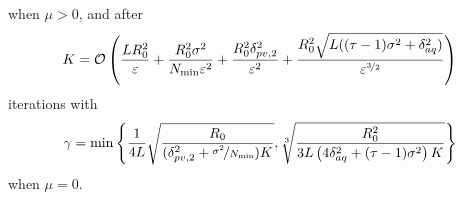 \begin{theorem}
\begin{equation*}
    \end{equation*}
    when $\mu > 0$, and after
    \begin{equation}
        K = {\cal O}\left(\frac{LR_0^2}{\varepsilon} +  \frac{R_0^2\sigma^2}{N_{\min}\varepsilon^2} + \frac{R_0^2\delta_{pv,2}^2}{\varepsilon^2} + \frac{R_0^2\sqrt{L((\tau-1)\sigma^2+\delta_{aq}^2)}}{\varepsilon^{\nicefrac{3}{2}}}\right)\label{eq:cvx_bound_2_supp}
    \end{equation}
    iterations with
    \begin{equation*}
       \gamma = \min\left\{\frac{1}{4L} \sqrt{\frac{R_0}{(\delta_{pv,2}^2 + \nicefrac{\sigma^2}{N_{\min}})K}}, \sqrt[3]{\frac{R_0^2}{3L\left(4\delta_{aq}^2 + (\tau-1)\sigma^2\right) K}}\right\}
    \end{equation*}
    when $\mu = 0$.
\end{theorem}
